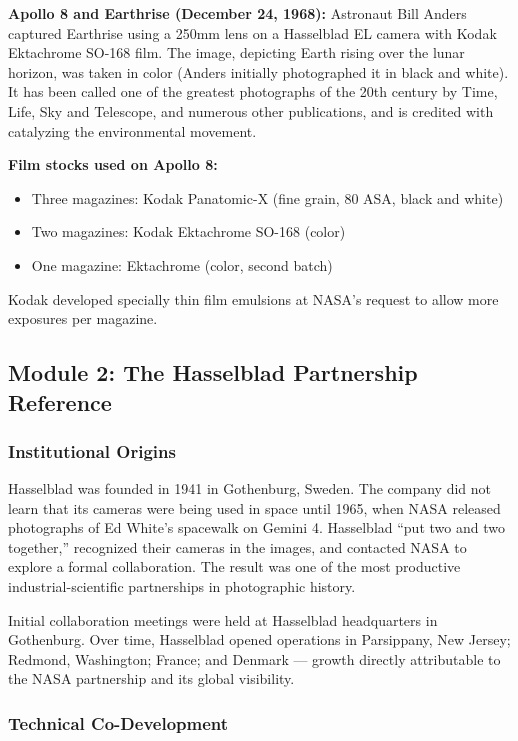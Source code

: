 \documentclass[11pt,letterpaper]{article}
\begin{document}
\textbf{Apollo 8 and Earthrise (December 24, 1968):} Astronaut Bill Anders captured Earthrise using a 250mm lens on a Hasselblad EL camera with Kodak Ektachrome SO-168 film. The image, depicting Earth rising over the lunar horizon, was taken in color (Anders initially photographed it in black and white). It has been called one of the greatest photographs of the 20th century by Time, Life, Sky and Telescope, and numerous other publications, and is credited with catalyzing the environmental movement.

\textbf{Film stocks used on Apollo 8:}
\begin{itemize}[leftmargin=1.5em]
  \item Three magazines: Kodak Panatomic-X (fine grain, 80 ASA, black and white)
  \item Two magazines: Kodak Ektachrome SO-168 (color)
  \item One magazine: Ektachrome (color, second batch)
\end{itemize}

Kodak developed specially thin film emulsions at NASA's request to allow more exposures per magazine.

\subsection{Module 2: The Hasselblad Partnership Reference}

\subsubsection{Institutional Origins}

Hasselblad was founded in 1941 in Gothenburg, Sweden. The company did not learn that its cameras were being used in space until 1965, when NASA released photographs of Ed White's spacewalk on Gemini 4. Hasselblad ``put two and two together,'' recognized their cameras in the images, and contacted NASA to explore a formal collaboration. The result was one of the most productive industrial-scientific partnerships in photographic history.

Initial collaboration meetings were held at Hasselblad headquarters in Gothenburg. Over time, Hasselblad opened operations in Parsippany, New Jersey; Redmond, Washington; France; and Denmark --- growth directly attributable to the NASA partnership and its global visibility.

\subsubsection{Technical Co-Development}
\end{document}
